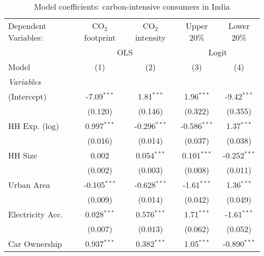
\begin{table}[htbp!]
   \centering
   \small
   \begin{adjustbox}{width = 1\textwidth, max height = 0.95\textheight, center}
      \begin{threeparttable}[b]
         \caption{\label{tab:Logit_1_IND} Model coefficients: carbon-intensive consumers in India}
         \begin{tabular}{lcccc}
            \tabularnewline \midrule \midrule
            Dependent Variables: & CO$_{2}$ footprint & CO$_{2}$ intensity & Upper 20\%     & Lower 20\%\\   
             & \multicolumn{2}{c}{OLS} & \multicolumn{2}{c}{Logit} \\ 
            Model                & (1)                & (2)                & (3)            & (4)\\  
            \midrule
            \emph{Variables}\\
            (Intercept)          & -7.09$^{***}$      & 1.81$^{***}$       & 1.96$^{***}$   & -9.42$^{***}$\\   
                                 & (0.120)            & (0.146)            & (0.322)        & (0.355)\\   
            HH Exp. (log)        & 0.997$^{***}$      & -0.296$^{***}$     & -0.586$^{***}$ & 1.37$^{***}$\\   
                                 & (0.016)            & (0.014)            & (0.037)        & (0.038)\\   
            HH Size              & 0.002              & 0.054$^{***}$      & 0.101$^{***}$  & -0.252$^{***}$\\   
                                 & (0.002)            & (0.003)            & (0.008)        & (0.011)\\   
            Urban Area           & -0.105$^{***}$     & -0.628$^{***}$     & -1.61$^{***}$  & 1.36$^{***}$\\   
                                 & (0.009)            & (0.014)            & (0.042)        & (0.049)\\   
            Electricity Acc.     & 0.028$^{***}$      & 0.576$^{***}$      & 1.71$^{***}$   & -1.61$^{***}$\\   
                                 & (0.007)            & (0.013)            & (0.062)        & (0.052)\\   
            Car Ownership        & 0.937$^{***}$      & 0.382$^{***}$      & 1.05$^{***}$   & -0.890$^{***}$\\   

\end{tabular}
\end{threeparttable}
\end{adjustbox}
\end{table}
